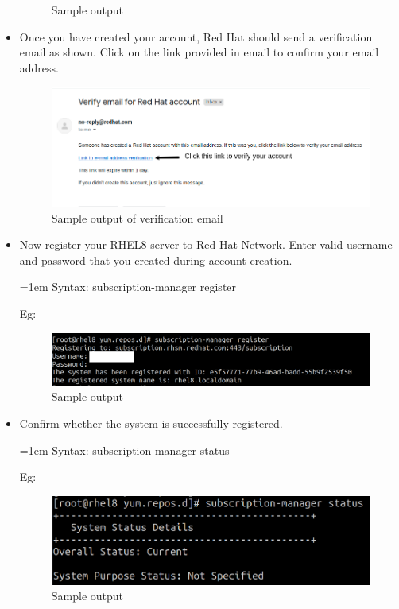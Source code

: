\begin{flushleft}
\begin{itemize}
\begin{figure}[h!]
				\caption{Sample output}
				\label{fig:iso3}
			\end{figure}
		\newpage
			\item Once you have created your account, Red Hat should send a verification email as shown. Click on the link provided in email to confirm your email address.
			\begin{figure}[h!]
				\centering
				\includegraphics[scale=.25]{content/chapter11/images/verify.png}
				\caption{Sample output of verification email}
				\label{fig:iso4}
			\end{figure}
			\item Now register your RHEL8 server to Red Hat Network. Enter valid username and password that you created during account creation.
				\begin{tcolorbox}[breakable,notitle,boxrule=-0pt,colback=pink,colframe=pink]
				\color{black}
				\font=1em
				Syntax: subscription-manager register
				\font=4pt
			\end{tcolorbox}
			Eg:
			\begin{figure}[h!]
				\centering
				\includegraphics[scale=.2]{content/chapter11/images/2.png}
				\caption{Sample output}
				\label{fig:iso5}
			\end{figure}
			
			\bigskip
						\bigskip
			\item Confirm whether the system is successfully registered.
			\begin{tcolorbox}[breakable,notitle,boxrule=-0pt,colback=pink,colframe=pink]
				\color{black}
				\font=1em
				Syntax: subscription-manager status
				\font=4pt
			\end{tcolorbox}
			Eg:
			\begin{figure}[h!]
				\centering
				\includegraphics[scale=.3]{content/chapter11/images/3.png}
				\caption{Sample output}
				\label{fig:iso6}
			\end{figure}
			

\end{itemize}
\end{flushleft}
